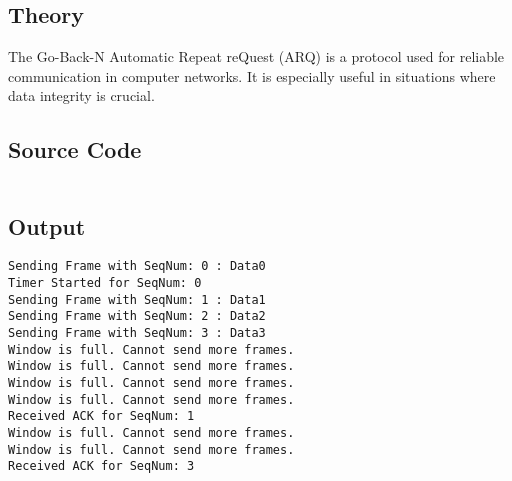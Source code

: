 \documentclass{korigamik}
\begin{document}
\subsection{Theory}

The Go-Back-N Automatic Repeat reQuest (ARQ) is a protocol used for reliable
communication in computer networks. It is especially useful in situations where
data integrity is crucial.

\subsection{Source Code} %

\inputminted[firstline=5, fontsize=\footnotesize]{cpp}{code/narq.cpp}

\subsection{Output}

\begin{lstlisting}[style=output]
Sending Frame with SeqNum: 0 : Data0
Timer Started for SeqNum: 0
Sending Frame with SeqNum: 1 : Data1
Sending Frame with SeqNum: 2 : Data2
Sending Frame with SeqNum: 3 : Data3
Window is full. Cannot send more frames.
Window is full. Cannot send more frames.
Window is full. Cannot send more frames.
Window is full. Cannot send more frames.
Received ACK for SeqNum: 1
Window is full. Cannot send more frames.
Window is full. Cannot send more frames.
Received ACK for SeqNum: 3
\end{lstlisting}
\end{document}
